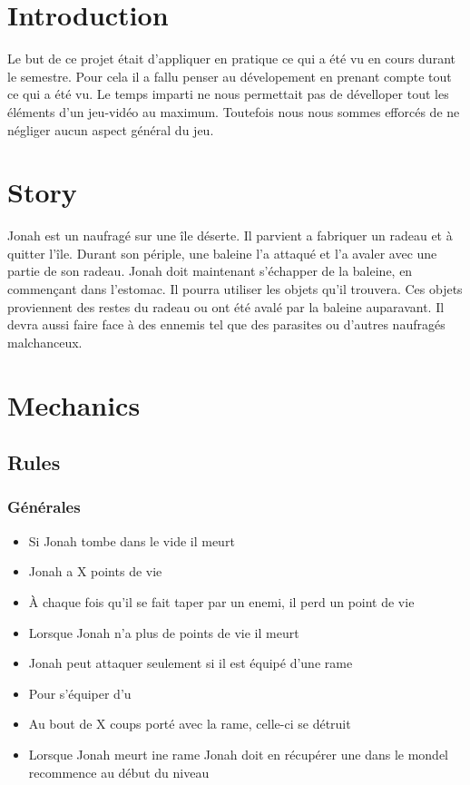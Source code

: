 \documentclass{prologArticle}
\begin{document}
\buildtitle



\section{Introduction}
Le but de ce projet était d'appliquer en pratique ce qui a été vu en cours durant le semestre. Pour cela il a fallu penser au dévelopement en prenant compte tout ce qui a été vu. Le temps imparti ne nous permettait pas de dévelloper tout les éléments d'un jeu-vidéo au maximum. Toutefois nous nous sommes efforcés de ne négliger aucun aspect général du jeu.

\section{Story}

Jonah est un naufragé sur une île déserte. Il parvient a fabriquer un radeau et à quitter l'île. Durant son périple, une baleine l'a attaqué et l'a avaler avec une partie de son radeau. Jonah doit maintenant s'échapper de la baleine, en commençant dans l'estomac. Il pourra utiliser les objets qu'il trouvera. Ces objets proviennent des restes du radeau ou ont été avalé par la baleine auparavant. Il devra aussi faire face à des ennemis tel que des parasites ou d'autres naufragés malchanceux.%

\section{Mechanics}

\subsection{Rules}

\subsubsection{Générales}
\begin{itemize}
    \item Si Jonah tombe dans le vide il meurt
    \item Jonah a X points de vie
    \item À chaque fois qu'il se fait taper par un enemi, il perd un point de vie
    \item Lorsque Jonah n'a plus de points de vie il meurt
    \item Jonah peut attaquer seulement si il est équipé d'une rame
    \item Pour s'équiper d'u
    \item Au bout de X coups porté avec la rame, celle-ci se détruit
    \item Lorsque Jonah meurt ine rame Jonah doit en récupérer une dans le mondel recommence au début du niveau
\end{itemize}
\end{document}
